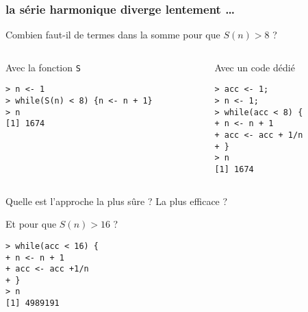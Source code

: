 \documentclass[10pt]{beamer}
\begin{document}
\begin{frame}[fragile]
  \frametitle{la série harmonique diverge lentement \dots}

  \begin{block}{Combien faut-il de termes dans la somme pour que $S(n) > 8$ ?}
  
\begin{columns}[t]
\begin{column}{0.55\textwidth}
  \begin{block}{Avec la fonction \texttt{S}}
    \begin{lstlisting}[style=block]
> n <- 1
> while(S(n) < 8) {n <- n + 1}
> n
[1] 1674      
\end{lstlisting}
  \end{block}
\end{column}
\begin{column}{0.45\textwidth}
  \begin{block}{Avec un code dédié}
    \begin{lstlisting}[style=block]
> acc <- 1;
> n <- 1;
> while(acc < 8) {
+ n <- n + 1
+ acc <- acc + 1/n
+ }
> n
[1] 1674          
\end{lstlisting}
\end{block}
\end{column}
\end{columns}
Quelle est l'approche la plus sûre ? La plus efficace ?
\end{block}

\begin{block}{Et pour que $S(n) > 16$ ?}

\begin{lstlisting}[style=block]
> while(acc < 16) {
+ n <- n + 1
+ acc <- acc +1/n
+ }  
> n
[1] 4989191  
\end{lstlisting}
\end{block}
\end{frame}



\end{document}
